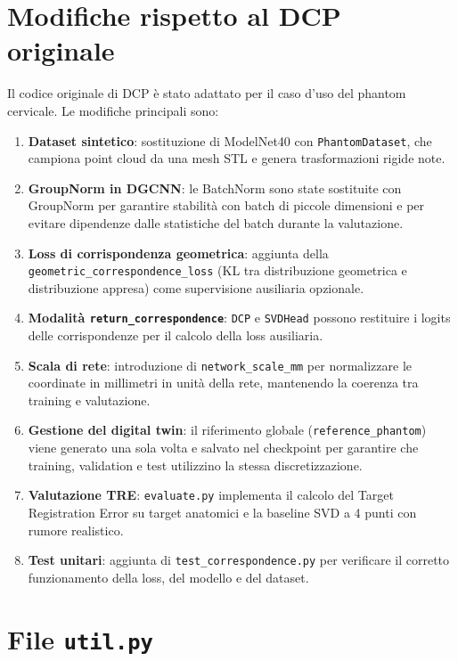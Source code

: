 \documentclass[11pt,a4paper]{article}
\begin{document}
\section{Modifiche rispetto al DCP originale}
\label{sec:modifiche}

Il codice originale di DCP \cite{dcp} è stato adattato per il caso d'uso del phantom cervicale. Le modifiche principali sono:

\begin{enumerate}
    \item \textbf{Dataset sintetico}: sostituzione di ModelNet40 con \texttt{PhantomDataset}, che campiona point cloud da una mesh STL e genera trasformazioni rigide note.
    \item \textbf{GroupNorm in DGCNN}: le BatchNorm sono state sostituite con GroupNorm per garantire stabilità con batch di piccole dimensioni e per evitare dipendenze dalle statistiche del batch durante la valutazione.
    \item \textbf{Loss di corrispondenza geometrica}: aggiunta della \texttt{geometric\_correspondence\_loss} (KL tra distribuzione geometrica e distribuzione appresa) come supervisione ausiliaria opzionale.
    \item \textbf{Modalità \texttt{return\_correspondence}}: \texttt{DCP} e \texttt{SVDHead} possono restituire i logits delle corrispondenze per il calcolo della loss ausiliaria.
    \item \textbf{Scala di rete}: introduzione di \texttt{network\_scale\_mm} per normalizzare le coordinate in millimetri in unità della rete, mantenendo la coerenza tra training e valutazione.
    \item \textbf{Gestione del digital twin}: il riferimento globale (\texttt{reference\_phantom}) viene generato una sola volta e salvato nel checkpoint per garantire che training, validation e test utilizzino la stessa discretizzazione.
    \item \textbf{Valutazione TRE}: \texttt{evaluate.py} implementa il calcolo del Target Registration Error su target anatomici e la baseline SVD a 4 punti con rumore realistico.
    \item \textbf{Test unitari}: aggiunta di \texttt{test\_correspondence.py} per verificare il corretto funzionamento della loss, del modello e del dataset.
\end{enumerate}

\section{File \texttt{util.py}}
\end{document}
